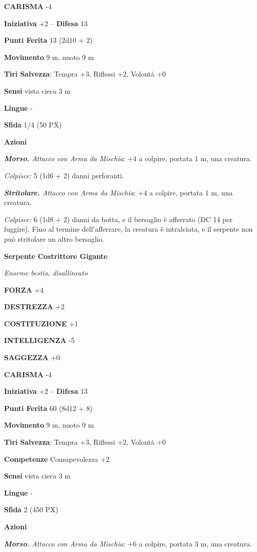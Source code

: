 \begin{multicols}{2}
	\textbf{CARISMA} -4

	\textbf{Iniziativa} +2 -- \textbf{Difesa} 13

	\textbf{Punti Ferita} 13 (2d10 + 2)

	\textbf{Movimento} 9 m, nuoto 9 m

	\textbf{Tiri Salvezza}: Tempra +3, Riflessi +2, Volontà +0

	\textbf{Sensi} vista cieca 3 m

	\textbf{Lingue} -

	\textbf{Sfida} 1/4 (50 PX)

	\textbf{Azioni}

	\textit{\textbf{Morso.} Attacco con Arma da Mischia}: +4 a colpire, portata 1 m, una creatura.

	\textit{Colpisce:} 5 (1d6 + 2) danni perforanti.

	\textit{\textbf{Stritolare.} Attacco con Arma da Mischia}: +4 a colpire, portata 1 m, una creatura.

	\textit{Colpisce:} 6 (1d8 + 2) danni da botta, e il bersaglio è afferrato (DC 14 per fuggire). Fino al termine dell'afferrare, la creatura è intralciata, e il serpente non può stritolare un altro bersaglio.

	\medskip\textbf{Serpente Costrittore Gigante}

	\textit{Enorme bestia, disallineato}

	\textbf{FORZA} +4

	\textbf{DESTREZZA} +2

	\textbf{COSTITUZIONE} +1

	\textbf{INTELLIGENZA} -5

	\textbf{SAGGEZZA} +0

	\textbf{CARISMA} -4

	\textbf{Iniziativa} +2 -- \textbf{Difesa} 13

	\textbf{Punti Ferita} 60 (8d12 + 8)

	\textbf{Movimento} 9 m, nuoto 9 m

	\textbf{Tiri Salvezza}: Tempra +3, Riflessi +2, Volontà +0

	\textbf{Competenze} Consapevolezza +2

	\textbf{Sensi} vista cieca 3 m

	\textbf{Lingue} -

	\textbf{Sfida} 2 (450 PX)

	\textbf{Azioni}

	\textit{\textbf{Morso.} Attacco con Arma da Mischia}: +6 a colpire, portata 3 m, una creatura.


\end{multicols}

